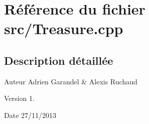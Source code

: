 \section{Référence du fichier src/\-Treasure.cpp}
\label{_treasure_8cpp}


\subsection{Description détaillée}
\begin{DoxyAuthor}{Auteur}
Adrien Garandel \& Alexis Ruchaud 
\end{DoxyAuthor}
\begin{DoxyVersion}{Version}
1. 
\end{DoxyVersion}
\begin{DoxyDate}{Date}
27/11/2013 
\end{DoxyDate}
